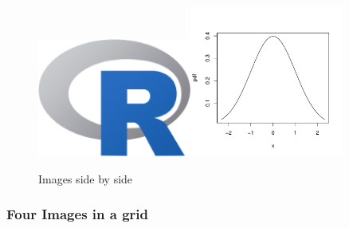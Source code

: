 \begin{figure}[htbp]
  \centering
  \includegraphics[width=0.45\textwidth]{Rlogo-5.png}\includegraphics[width=0.45\textwidth]{normal}
  \caption{Images side by side}
  \label{fig:twoimages}
\end{figure}

\subsubsection{Four Images in a grid}


